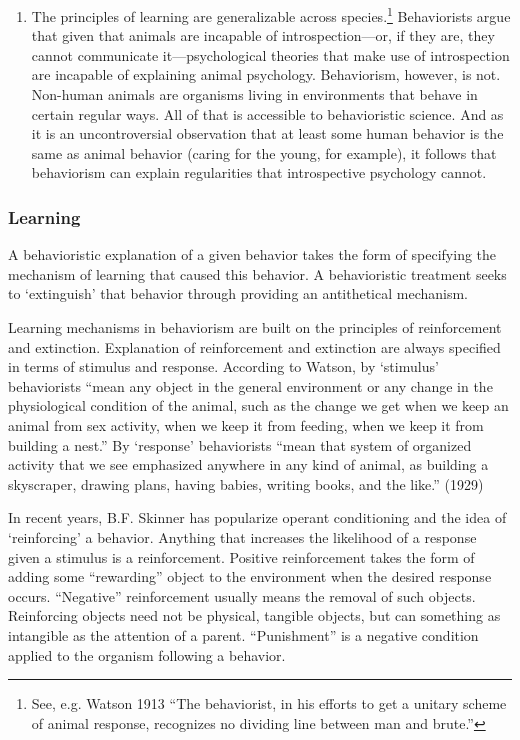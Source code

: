 \begin{enumerate}
\item The principles of learning are generalizable across species.\footnote{See, e.g. Watson 1913 “The behaviorist, in his efforts to get a unitary scheme of animal response, recognizes no dividing line between man and brute.”} Behaviorists argue that given that animals are incapable of introspection—or, if they are, they cannot communicate it—psychological theories that make use of introspection are incapable of explaining animal psychology. Behaviorism, however, is not. Non-human animals are organisms living in environments that behave in certain regular ways. All of that is accessible to behavioristic science. And as it is an uncontroversial observation that at least some human behavior is the same as animal behavior (caring for the young, for example), it follows that behaviorism can explain regularities that introspective psychology cannot.

\end{enumerate}

\subsubsection{Learning}
\label{learning}

A behavioristic explanation of a given behavior takes the form of specifying the mechanism of learning that caused this behavior. A behavioristic treatment seeks to `extinguish' that behavior through providing an antithetical mechanism.

Learning mechanisms in behaviorism are built on the principles of reinforcement and extinction. Explanation of reinforcement and extinction are always specified in terms of stimulus and response. According to Watson, by `stimulus' behaviorists “mean any object in the general environment or any change in the physiological condition of the animal, such as the change we get when we keep an animal from sex activity, when we keep it from feeding, when we keep it from building a nest.” By `response' behaviorists “mean that system of organized activity that we see emphasized anywhere in any kind of animal, as building a skyscraper, drawing plans, having babies, writing books, and the like.” (1929)

In recent years, B.F. Skinner has popularize operant conditioning and the idea of `reinforcing' a behavior. Anything that increases the likelihood of a response given a stimulus is a reinforcement. Positive reinforcement takes the form of adding some “rewarding” object to the environment when the desired response occurs. “Negative” reinforcement usually means the removal of such objects. Reinforcing objects need not be physical, tangible objects, but can something as intangible as the attention of a parent. “Punishment” is a negative condition applied to the organism following a behavior.

